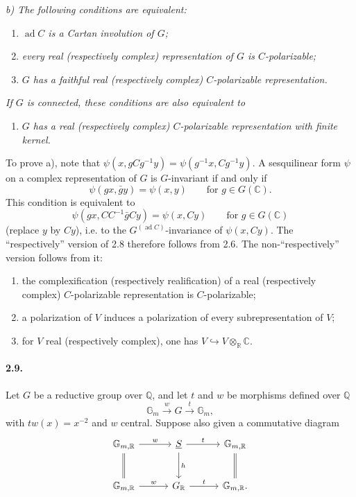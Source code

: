 \documentclass[10pt,leqno]{article}
\newcommand{\C}{\mathbb{C}}
\newcommand{\Q}{\mathbb{Q}}
\newcommand{\R}{\mathbb{R}}
\newcommand{\Gm}{\mathbb{G}_m}
\newcommand{\ad}{\operatorname{ad}}
\newcommand{\into}{\hookrightarrow}
\begin{document}
\emph{b) The following conditions are equivalent:}

\clearpage

\begin{enumerate}[label=(\roman*)]
\item \emph{$\ad C$ is a Cartan involution of $G$;}
\item \emph{every real (respectively complex) representation of $G$ is $C$-polarizable;}
\item \emph{$G$ has a faithful real (respectively complex) $C$-polarizable representation.}
\end{enumerate}
\emph{If $G$ is connected, these conditions are also equivalent to}
\begin{enumerate}[label=(iii\textquotesingle)]
\item \emph{$G$ has a real (respectively complex) $C$-polarizable representation with finite kernel.}
\end{enumerate}

To prove a), note that $\psi(x,gCg^{-1}y)=\psi(g^{-1}x,Cg^{-1}y)$. A sesquilinear form $\psi$ on a complex representation of $G$ is $G$-invariant if and only if
\[
\psi(gx,\bar g y)=\psi(x,y)\qquad\text{for }g\in G(\C).
\]
This condition is equivalent to
\[
\psi(gx,CC^{-1}\bar g Cy)=\psi(x,Cy)\qquad\text{for }g\in G(\C)
\]
(replace $y$ by $Cy$), i.e. to the $G^{(\ad C)}$-invariance of $\psi(x,Cy)$. The ``respectively'' version of 2.8 therefore follows from 2.6. The non-``respectively'' version follows from it:
\begin{enumerate}[label=\alph*)]
\item the complexification (respectively realification) of a real (respectively complex) $C$-polarizable representation is $C$-polarizable;
\item a polarization of $V$ induces a polarization of every subrepresentation of $V$;
\item for $V$ real (respectively complex), one has $V\into V\otimes_\R\C$.
\end{enumerate}

\paragraph{2.9.} Let $G$ be a reductive group over $\Q$, and let $t$ and $w$ be morphisms defined over $\Q$
\[
\Gm \xrightarrow{\ w\ } G \xrightarrow{\ t\ } \Gm,
\]
with $tw(x)=x^{-2}$ and $w$ central. Suppose also given a commutative diagram
\[
\begin{tikzcd}[column sep=3em,row sep=2.6em]
\mathbb G_{m,\R} \arrow[r,"w"] \arrow[d,equal] & \underline S \arrow[r,"t"] \arrow[d,"h"] & \mathbb G_{m,\R} \arrow[d,equal]\\
\mathbb G_{m,\R} \arrow[r,"w"] & G_\R \arrow[r,"t"] & \mathbb G_{m,\R}.
\end{tikzcd}
\]
\end{document}
